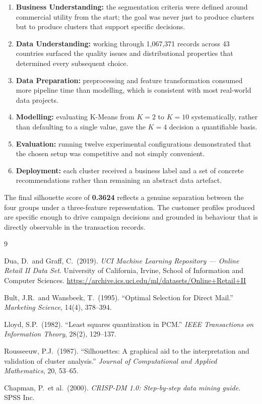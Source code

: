 \documentclass[12pt, a4paper]{article}
\begin{document}
\begin{enumerate}[nosep]
    \item \textbf{Business Understanding:} the segmentation criteria were defined around commercial utility from the start; the goal was never just to produce clusters but to produce clusters that support specific decisions.
    \item \textbf{Data Understanding:} working through 1,067,371 records across 43 countries surfaced the quality issues and distributional properties that determined every subsequent choice.
    \item \textbf{Data Preparation:} preprocessing and feature transformation consumed more pipeline time than modelling, which is consistent with most real-world data projects.
    \item \textbf{Modelling:} evaluating K-Means from $K=2$ to $K=10$ systematically, rather than defaulting to a single value, gave the $K=4$ decision a quantifiable basis.
    \item \textbf{Evaluation:} running twelve experimental configurations demonstrated that the chosen setup was competitive and not simply convenient.
    \item \textbf{Deployment:} each cluster received a business label and a set of concrete recommendations rather than remaining an abstract data artefact.
\end{enumerate}

\noindent The final silhouette score of \textbf{0.3624} reflects a genuine separation between the four groups under a three-feature representation. The customer profiles produced are specific enough to drive campaign decisions and grounded in behaviour that is directly observable in the transaction records.

\newpage
\begin{thebibliography}{9}

Dua, D.\ and Graff, C.\ (2019).
\textit{UCI Machine Learning Repository --- Online Retail II Data Set}.
University of California, Irvine, School of Information and Computer Sciences.
\url{https://archive.ics.uci.edu/ml/datasets/Online+Retail+II}

Bult, J.R.\ and Wansbeek, T.\ (1995).
``Optimal Selection for Direct Mail.''
\textit{Marketing Science}, 14(4), 378--394.

Lloyd, S.P.\ (1982).
``Least squares quantization in PCM.''
\textit{IEEE Transactions on Information Theory}, 28(2), 129--137.

Rousseeuw, P.J.\ (1987).
``Silhouettes: A graphical aid to the interpretation and validation of cluster analysis.''
\textit{Journal of Computational and Applied Mathematics}, 20, 53--65.

Chapman, P.\ et al.\ (2000).
\textit{CRISP-DM 1.0: Step-by-step data mining guide}.
SPSS Inc.

\end{thebibliography}
\end{document}
